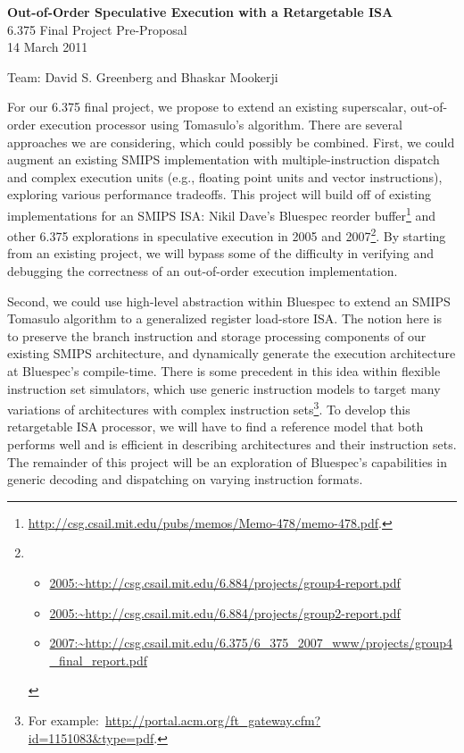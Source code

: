 \documentclass[12pt]{article}
\begin{document}
	\begin{center}
		\textbf{\large Out-of-Order Speculative Execution with a Retargetable ISA } \\
		6.375 Final Project Pre-Proposal\\
		14 March 2011 \\
		
		\vspace{\baselineskip}
		
		Team: David S. Greenberg and Bhaskar Mookerji
	\end{center}
	
	For our 6.375 final project, we propose to extend an existing superscalar, out-of-order execution processor using Tomasulo's algorithm. There are several approaches we are considering, which could possibly be combined. First, we could augment an existing SMIPS implementation with multiple-instruction dispatch and complex execution units (e.g., floating point units and vector instructions), exploring various performance tradeoffs. This project will build off of existing implementations for an SMIPS ISA: Nikil Dave's  Bluespec reorder buffer\footnote{\url{http://csg.csail.mit.edu/pubs/memos/Memo-478/memo-478.pdf}.} and other 6.375 explorations in speculative execution in 2005 and 2007\footnote{\begin{itemize}
		\item \url{2005:~http://csg.csail.mit.edu/6.884/projects/group4-report.pdf}
		\item \url{2005:~http://csg.csail.mit.edu/6.884/projects/group2-report.pdf}
		\item \url{2007:~http://csg.csail.mit.edu/6.375/6_375_2007_www/projects/group4_final_report.pdf}
	\end{itemize}}. By starting from an existing project, we will bypass some of the difficulty in verifying and debugging the correctness of an out-of-order execution implementation. 
	
	Second, we could use high-level abstraction within Bluespec to extend an SMIPS Tomasulo algorithm to a generalized register load-store ISA. The notion here is to preserve the branch instruction and storage processing components of our existing SMIPS architecture, and dynamically generate the execution architecture at Bluespec's compile-time. There is some precedent in this idea within flexible instruction set simulators, which use generic instruction models to target many variations of architectures with complex instruction sets\footnote{For example:~\url{http://portal.acm.org/ft_gateway.cfm?id=1151083&type=pdf}.}. To develop this retargetable ISA processor, we will have to find a reference model that both performs well and is efficient in describing architectures and their instruction sets. The remainder of this project will be an exploration of Bluespec's capabilities in generic decoding and dispatching on varying instruction formats.
	
\end{document}
